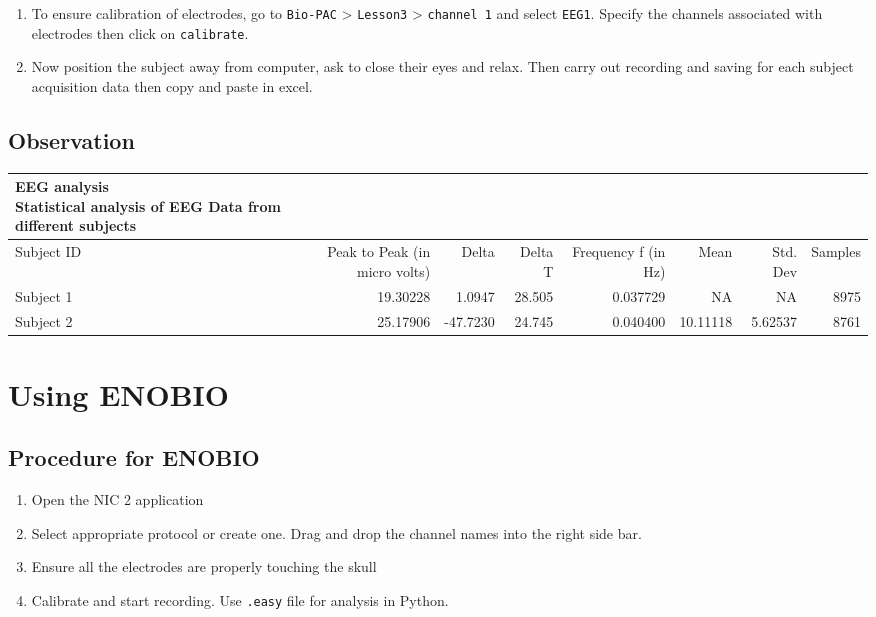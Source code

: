 \documentclass[
  11pt,
  letterpaper,
  DIV=11,
  numbers=noendperiod]{scrreprt}
\providecommand{\tightlist}{%
  \setlength{\itemsep}{0pt}\setlength{\parskip}{0pt}}\usepackage{longtable,booktabs,array}
\begin{document}
\begin{enumerate}
\def\labelenumi{\arabic{enumi}.}
\setcounter{enumi}{1}
\item
  To ensure calibration of electrodes, go to \texttt{Bio-PAC}
  \textgreater{} \texttt{Lesson3} \textgreater{} \texttt{channel\ 1} and
  select \texttt{EEG1}. Specify the channels associated with electrodes
  then click on \texttt{calibrate}.
\item
  Now position the subject away from computer, ask to close their eyes
  and relax. Then carry out recording and saving for each subject
  acquisition data then copy and paste in excel.
\end{enumerate}

\subsection{Observation}\label{observation-3}

\begin{longtable*}{lrrrrrrr}
\caption*{
{\large EEG analysis} \\ 
{\small Statistical analysis of EEG Data from different subjects}
} \\ 
\toprule
Subject ID & Peak to Peak (in micro volts) & Delta & Delta T & Frequency f (in Hz) & Mean & Std. Dev & Samples \\ 
\midrule\addlinespace[2.5pt]
Subject 1 & 19.30228 & 1.0947 & 28.505 & 0.037729 & NA & NA & 8975 \\ 
Subject 2 & 25.17906 & -47.7230 & 24.745 & 0.040400 & 10.11118 & 5.62537 & 8761 \\ 
\bottomrule
\end{longtable*}

\section{Using ENOBIO}\label{using-enobio}

\subsection{Procedure for ENOBIO}\label{procedure-for-enobio}

\begin{enumerate}
\def\labelenumi{\arabic{enumi}.}
\tightlist
\item
  Open the NIC 2 application
\item
  Select appropriate protocol or create one. Drag and drop the channel
  names into the right side bar.
\item
  Ensure all the electrodes are properly touching the skull
\item
  Calibrate and start recording. Use \texttt{.easy} file for analysis in
  Python.
\end{enumerate}
\end{document}
